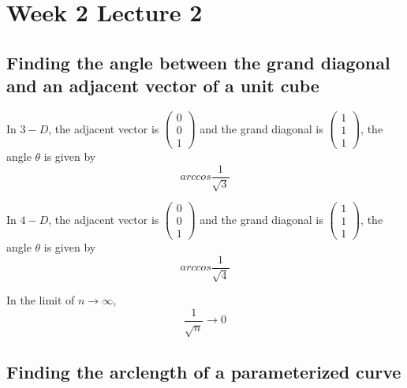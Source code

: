 \chapter{Week 2 Lecture 2}

\section{Finding the angle between the grand diagonal and an adjacent vector of a unit cube}
\begin{framed}
   In $3-D$, the adjacent vector is $ \begin{pmatrix} 0 \\ 0 \\ 1 \end{pmatrix} $ and the grand diagonal is $ \begin{pmatrix} 1 \\ 1 \\ 1 \end{pmatrix} $, the angle $ \theta $ is given by \[
   arccos \frac{1}{\sqrt{3}}
   \] 
  
   In $4-D$, the adjacent vector is $ \begin{pmatrix} 0 \\ 0 \\ 1 \end{pmatrix} $ and the grand diagonal is $ \begin{pmatrix} 1 \\ 1 \\ 1 \end{pmatrix} $, the angle $ \theta $ is given by \[
   arccos \frac{1}{\sqrt{4}}
   \] 

   In the limit of $ n \to \infty$, \[
      \frac{1}{\sqrt{n}} \to 0
   \] 
\end{framed}



\section{Finding the arclength of a parameterized curve}

